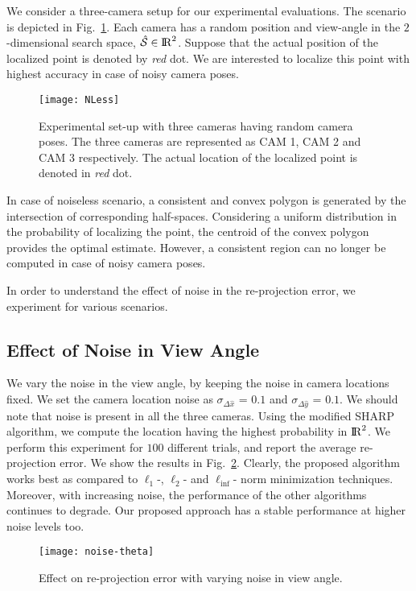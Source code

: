 We consider a three-camera setup for our experimental evaluations. The scenario is depicted in Fig.~\ref{fig:eval3}. Each camera has a random position and view-angle in the $2$-dimensional search space, $\hat{\mathcal{S}} \in {\rm I\!R}^{2}$. Suppose that the actual position of the localized point is denoted by \emph{red} dot. We are interested to localize this point with highest accuracy in case of noisy camera poses.

\begin{figure}[htb]
\centering
\texttt{[image: NLess]}
\caption[Experimental set-up with three cameras having random camera poses.]{Experimental set-up with three cameras having random camera poses. The three cameras are represented as CAM 1, CAM 2 and CAM 3 respectively. The actual location of the localized point is denoted in \emph{red} dot.}
\label{fig:eval3}	
\end{figure}

In case of noiseless scenario, a consistent and convex polygon is generated by the intersection of corresponding half-spaces. Considering a uniform distribution in the probability of localizing the point, the centroid of the convex polygon provides the optimal estimate. However, a consistent region can no longer be computed in case of noisy camera poses.

In order to understand the effect of noise in the re-projection error, we experiment for various scenarios.

\subsection{Effect of Noise in View Angle}
We vary the noise in the view angle, by keeping the noise in camera locations fixed. We set the camera location noise as $\sigma_{\Delta \hat{x}}$ = $0.1$ and $\sigma_{\Delta \hat{y}}$ = $0.1$. We should note that noise is present in all the three cameras. Using the modified SHARP algorithm, we compute the location having the highest probability in ${\rm I\!R}^{2}$. We perform this experiment for $100$ different trials, and report the average re-projection error. We show the results in Fig.~\ref{fig:noise-angle}. Clearly, the proposed algorithm works best as compared to $\ell_1$-, $\ell_2$- and $\ell_{\mbox{inf}}$- norm minimization techniques. Moreover, with increasing noise, the performance of the other algorithms continues to degrade. Our proposed approach has a stable performance at higher noise levels too.

\begin{figure}[htb]
\centering
\texttt{[image: noise-theta]}
\caption{Effect on re-projection error with varying noise in view angle.}
\label{fig:noise-angle}	
\end{figure}

